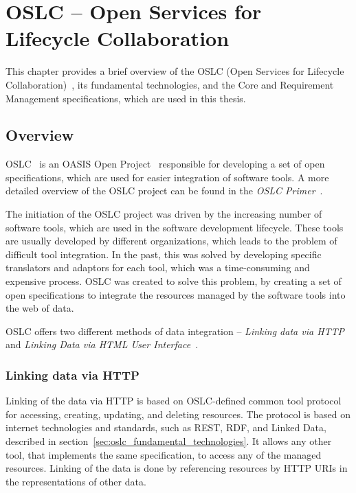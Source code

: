
\chapter{OSLC -- Open Services for Lifecycle Collaboration}
\label{chapter:oslc}
This chapter provides a brief overview of the OSLC (Open Services for Lifecycle Collaboration) \cite{oslc}, its fundamental technologies, and the Core and Requirement Management specifications, which are used in this thesis.

\section{Overview}
OSLC \cite{oslc} is an OASIS Open Project \cite{oasis_open} responsible for developing a set of open specifications, which are used for easier integration of software tools. A more detailed overview of the OSLC project can be found in the \emph{OSLC Primer} \cite{oslc_primer}.

The initiation of the OSLC project was driven by the increasing number of software tools, which are used in the software development lifecycle. These tools are usually developed by different organizations, which leads to the problem of difficult tool integration. In the past, this was solved by developing specific translators and adaptors for each tool, which was a time-consuming and expensive process. OSLC was created to solve this problem, by creating a set of open specifications to integrate the resources managed by the software tools into the web of data.

OSLC offers two different methods of data integration -- \emph{Linking data via HTTP} and \emph{Linking Data via HTML User Interface} \cite{oslc_primary_integration_techniques}.


\subsection*{Linking data via HTTP}
Linking of the data via HTTP is based on OSLC-defined common tool protocol for accessing, creating, updating, and deleting resources. The protocol is based on internet technologies and standards, such as REST, RDF, and Linked Data, described in section \ref{sec:oslc_fundamental_technologies}. It allows any other tool, that implements the same specification, to access any of the managed resources. Linking of the data is done by referencing resources by HTTP URIs in the representations of other data.

